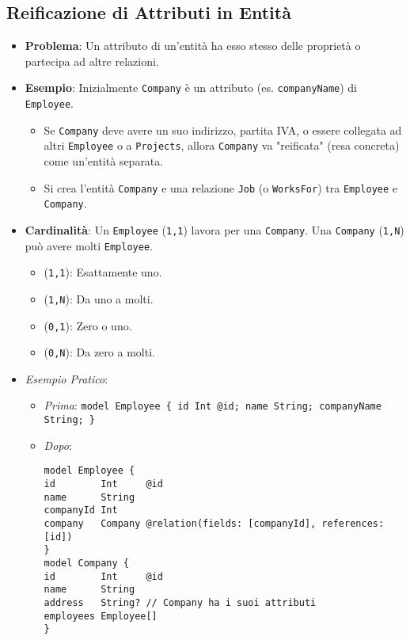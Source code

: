 \subsection{Reificazione di Attributi in Entità}
\begin{itemize}
	\item \textbf{Problema}: Un attributo di un'entità ha esso stesso delle proprietà o partecipa ad altre relazioni.
	\item \textbf{Esempio}: Inizialmente \texttt{Company} è un attributo (es. \texttt{companyName}) di \texttt{Employee}.
	\begin{itemize}
		\item Se \texttt{Company} deve avere un suo indirizzo, partita IVA, o essere collegata ad altri \texttt{Employee} o a \texttt{Projects}, allora \texttt{Company} va "reificata" (resa concreta) come un'entità separata.
		\item Si crea l'entità \texttt{Company} e una relazione \texttt{Job} (o \texttt{WorksFor}) tra \texttt{Employee} e \texttt{Company}.
	\end{itemize}
	\item \textbf{Cardinalità}: Un \texttt{Employee} (\texttt{1,1}) lavora per una \texttt{Company}. Una \texttt{Company} (\texttt{1,N}) può avere molti \texttt{Employee}.
	\begin{itemize}
		\item (\texttt{1,1}): Esattamente uno.
		\item (\texttt{1,N}): Da uno a molti.
		\item (\texttt{0,1}): Zero o uno.
		\item (\texttt{0,N}): Da zero a molti.
	\end{itemize}
	\item \textit{Esempio Pratico}:
	\begin{itemize}
		\item \textit{Prima}: \texttt{model Employee \{ id Int @id; name String; companyName String; \}}
		\item \textit{Dopo}:
		\begin{verbatim}
model Employee {
id        Int     @id
name      String
companyId Int
company   Company @relation(fields: [companyId], references: [id])
}
model Company {
id        Int     @id
name      String
address   String? // Company ha i suoi attributi
employees Employee[]
}
		\end{verbatim}
	\end{itemize}
\end{itemize}

